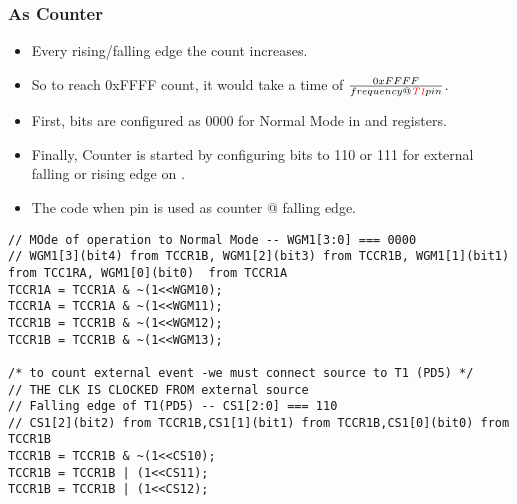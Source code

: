 \documentclass{article}
\begin{document}
\subsubsection{As Counter}
\begin{itemize}
    \item Every rising/falling edge the count increases.
    \item So to reach 0xFFFF count, it would take a time of $\frac{0xFFFF}{frequency @ \emph{\textcolor{red}{T1}} pin}$.
    \item First,  bits are configured as 0000 for Normal Mode in  and  registers.
    \item Finally, Counter is started by configuring  bits to 110 or 111 for external falling or rising edge on .
    \item The code when  pin is used as counter @ falling edge.
\end{itemize}
\begin{verbatim}
// MOde of operation to Normal Mode -- WGM1[3:0] === 0000
// WGM1[3](bit4) from TCCR1B, WGM1[2](bit3) from TCCR1B, WGM1[1](bit1)  from TCC1RA, WGM1[0](bit0)  from TCCR1A	
TCCR1A = TCCR1A & ~(1<<WGM10);
TCCR1A = TCCR1A & ~(1<<WGM11);
TCCR1B = TCCR1B & ~(1<<WGM12);
TCCR1B = TCCR1B & ~(1<<WGM13);
    
/* to count external event -we must connect source to T1 (PD5) */
// THE CLK IS CLOCKED FROM external source
// Falling edge of T1(PD5) -- CS1[2:0] === 110
// CS1[2](bit2) from TCCR1B,CS1[1](bit1) from TCCR1B,CS1[0](bit0) from TCCR1B
TCCR1B = TCCR1B & ~(1<<CS10);
TCCR1B = TCCR1B | (1<<CS11);
TCCR1B = TCCR1B | (1<<CS12);
\end{verbatim}
\end{document}
